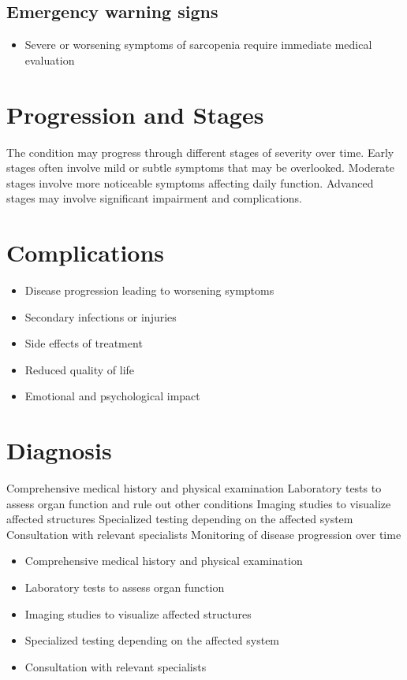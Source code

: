 \subsection{Emergency warning signs}
\begin{itemize}[noitemsep]
  \item Severe or worsening symptoms of sarcopenia require immediate medical evaluation
\end{itemize}
\section{Progression and Stages}
The condition may progress through different stages of severity over time. Early stages often involve mild or subtle symptoms that may be overlooked. Moderate stages involve more noticeable symptoms affecting daily function. Advanced stages may involve significant impairment and complications.
\section{Complications}
\begin{itemize}[noitemsep]
  \item Disease progression leading to worsening symptoms
  \item Secondary infections or injuries
  \item Side effects of treatment
  \item Reduced quality of life
  \item Emotional and psychological impact
\end{itemize}
\section{Diagnosis}
Comprehensive medical history and physical examination Laboratory tests to assess organ function and rule out other conditions Imaging studies to visualize affected structures Specialized testing depending on the affected system Consultation with relevant specialists Monitoring of disease progression over time

\begin{itemize}[noitemsep]
  \item Comprehensive medical history and physical examination
  \item Laboratory tests to assess organ function
  \item Imaging studies to visualize affected structures
  \item Specialized testing depending on the affected system
  \item Consultation with relevant specialists
\end{itemize}
